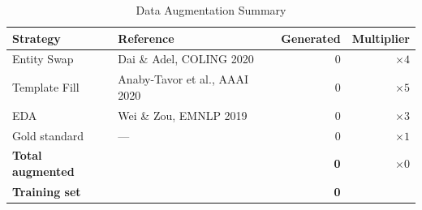 \begin{table}[h]
\centering
\caption{Data Augmentation Summary}
\label{tab:augmentation}
\begin{tabular}{llrr}
\toprule
\textbf{Strategy} & \textbf{Reference} & \textbf{Generated} & \textbf{Multiplier} \\
\midrule
Entity Swap & Dai \& Adel, COLING 2020 & 0 & $\times 4$ \\
Template Fill & Anaby-Tavor et al., AAAI 2020 & 0 & $\times 5$ \\
EDA & Wei \& Zou, EMNLP 2019 & 0 & $\times 3$ \\
\midrule
Gold standard & — & 0 & $\times 1$ \\
\textbf{Total augmented} & & \textbf{0} & $\times 0$ \\
\textbf{Training set} & & \textbf{0} & \\
\bottomrule
\end{tabular}
\end{table}